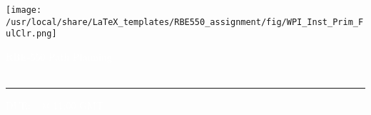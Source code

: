 \documentclass[letterpaper]{article}
\begin{document}



\makeatletter
\def\printauthor{{\large \@author}}
\makeatother


\author{%
\textbf{Daniel Montrallo Flickinger, PhD}%
}

\begin{titlepage}
\BgThispage
{}
\noindent
\vspace*{0.10\textheight}
\texttt{[image: /usr/local/share/LaTeX\_templates/RBE550\_assignment/fig/WPI\_Inst\_Prim\_FulClr.png]}%
\noindent
\begin{flushright}
\textcolor{white}{RBE-550 Path Planning\\%
\Huge\textbf{\assignmenttype~\assignmentnumber\\\assignmenttitle}}
\end{flushright}
\vspace*{2cm}\par
\noindent
\begin{minipage}{0.35\linewidth}
 \begin{flushright}
  \textcolor{white}{\printauthor}
 \end{flushright}
\end{minipage} \hspace{15pt}
%
%
\begin{minipage}{0.02\linewidth}
\textcolor{white}{\rule{1pt}{175pt}}
\end{minipage} \hspace{-10pt}
%
\begin{minipage}{0.63\linewidth}
\vspace{5pt}
\textcolor{white}{%
{\huge{DUE: \assignmentdue ~ @ 11:00 GMT}}} \\
%
\textcolor{white}{%
\assignmentabstract%
}
\end{minipage}
\end{titlepage}
\restoregeometry
\end{document}
